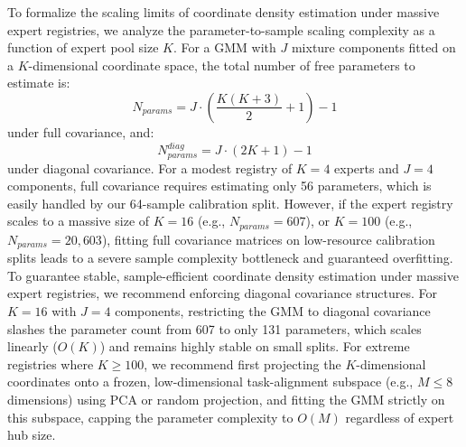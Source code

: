 \begin{itemize}
    To formalize the scaling limits of coordinate density estimation under massive expert registries, we analyze the parameter-to-sample scaling complexity as a function of expert pool size $K$. For a GMM with $J$ mixture components fitted on a $K$-dimensional coordinate space, the total number of free parameters to estimate is:
    \begin{equation}
    N_{params} = J \cdot \left( \frac{K(K+3)}{2} + 1 \right) - 1
    \label{eq:gmm_param_complexity}
    \end{equation}
    under full covariance, and:
    \begin{equation}
    N_{params}^{diag} = J \cdot (2K + 1) - 1
    \label{eq:gmm_diag_complexity}
    \end{equation}
    under diagonal covariance. For a modest registry of $K=4$ experts and $J=4$ components, full covariance requires estimating only 56 parameters, which is easily handled by our 64-sample calibration split. However, if the expert registry scales to a massive size of $K=16$ (e.g., $N_{params} = 607$), or $K=100$ (e.g., $N_{params} = 20,603$), fitting full covariance matrices on low-resource calibration splits leads to a severe sample complexity bottleneck and guaranteed overfitting. To guarantee stable, sample-efficient coordinate density estimation under massive expert registries, we recommend enforcing diagonal covariance structures. For $K=16$ with $J=4$ components, restricting the GMM to diagonal covariance slashes the parameter count from 607 to only 131 parameters, which scales linearly ($O(K)$) and remains highly stable on small splits. For extreme registries where $K \ge 100$, we recommend first projecting the $K$-dimensional coordinates onto a frozen, low-dimensional task-alignment subspace (e.g., $M \le 8$ dimensions) using PCA or random projection, and fitting the GMM strictly on this subspace, capping the parameter complexity to $O(M)$ regardless of expert hub size.


\end{itemize}
